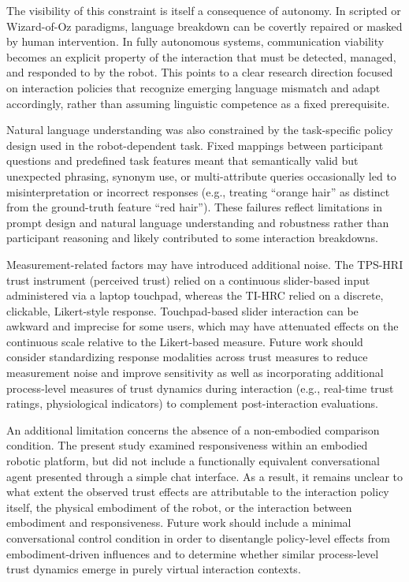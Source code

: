\documentclass[
]{article}
\begin{document}
The visibility of this constraint is itself a consequence of autonomy.
In scripted or Wizard-of-Oz paradigms, language breakdown can be
covertly repaired or masked by human intervention. In fully autonomous
systems, communication viability becomes an explicit property of the
interaction that must be detected, managed, and responded to by the
robot. This points to a clear research direction focused on interaction
policies that recognize emerging language mismatch and adapt
accordingly, rather than assuming linguistic competence as a fixed
prerequisite.

Natural language understanding was also constrained by the task-specific
policy design used in the robot-dependent task. Fixed mappings between
participant questions and predefined task features meant that
semantically valid but unexpected phrasing, synonym use, or
multi-attribute queries occasionally led to misinterpretation or
incorrect responses (e.g., treating ``orange hair'' as distinct from the
ground-truth feature ``red hair''). These failures reflect limitations
in prompt design and natural language understanding and robustness
rather than participant reasoning and likely contributed to some
interaction breakdowns.

Measurement-related factors may have introduced additional noise. The
TPS-HRI trust instrument (perceived trust) relied on a continuous
slider-based input administered via a laptop touchpad, whereas the
TI-HRC relied on a discrete, clickable, Likert-style response.
Touchpad-based slider interaction can be awkward and imprecise for some
users, which may have attenuated effects on the continuous scale
relative to the Likert-based measure. Future work should consider
standardizing response modalities across trust measures to reduce
measurement noise and improve sensitivity as well as incorporating
additional process-level measures of trust dynamics during interaction
(e.g., real-time trust ratings, physiological indicators) to complement
post-interaction evaluations.

An additional limitation concerns the absence of a non-embodied
comparison condition. The present study examined responsiveness within
an embodied robotic platform, but did not include a functionally
equivalent conversational agent presented through a simple chat
interface. As a result, it remains unclear to what extent the observed
trust effects are attributable to the interaction policy itself, the
physical embodiment of the robot, or the interaction between embodiment
and responsiveness. Future work should include a minimal conversational
control condition in order to disentangle policy-level effects from
embodiment-driven influences and to determine whether similar
process-level trust dynamics emerge in purely virtual interaction
contexts.
\end{document}
